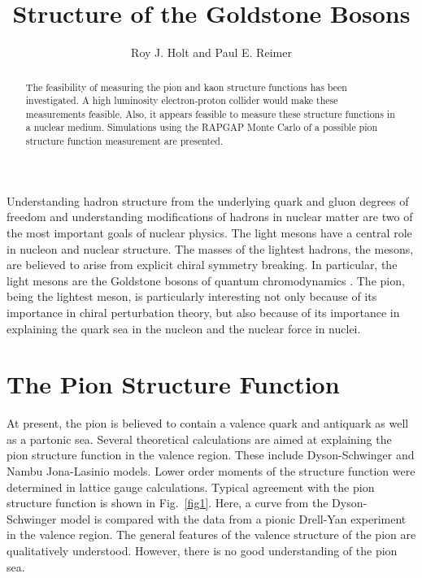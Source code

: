 
\epsfclipon


\title{Structure of the Goldstone Bosons}

\author{Roy J. Holt and Paul E. Reimer}
\address{Argonne National Laboratory\\
         Argonne, Illinois  60439}

\maketitle


\begin{abstract}
The feasibility of measuring the pion and kaon structure functions has
been investigated.  A high luminosity electron-proton collider would
make these measurements feasible.  Also, it appears feasible to
measure these structure functions in a nuclear medium.  Simulations
using the RAPGAP Monte Carlo of a possible pion structure function
measurement are presented.
\end{abstract}

Understanding hadron structure from the underlying quark and gluon
degrees of freedom and understanding modifications of hadrons in
nuclear matter are two of the most important goals of nuclear physics.
The light mesons have a central role in nucleon and nuclear structure.
The masses of the lightest hadrons, the mesons, are believed to arise
from explicit chiral symmetry breaking.  In particular, the light
mesons are the Goldstone bosons of quantum chromodynamics
\cite{mrt98}.  The pion, being the lightest meson, is particularly
interesting not only because of its importance in chiral perturbation
theory, but also because of its importance in explaining the quark sea
in the nucleon and the nuclear force in nuclei.
	

\section*{The Pion Structure Function}

At present, the pion is believed to contain a valence quark and
antiquark as well as a partonic sea.  Several theoretical calculations
are aimed at explaining the pion structure function in the valence
region.  These include Dyson-Schwinger\cite{hecht} and Nambu
Jona-Lasinio models\cite{shigetani,davidson}.  Lower order moments of
the structure function were determined in lattice gauge
calculations\cite{best}.  Typical agreement with the pion structure
function is shown in Fig.~\ref{fig1}.  Here, a curve from the
Dyson-Schwinger model is compared with the data from a pionic
Drell-Yan experiment\cite{conway} in the valence region.  The general
features of the valence structure of the pion are qualitatively
understood.  However, there is no good understanding of the pion sea.

